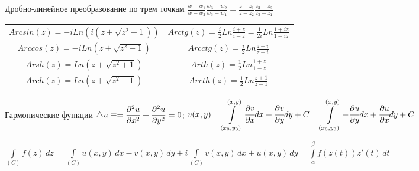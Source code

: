 \noindent
Дробно-линейное преобразование по трем точкам
$\displaystyle \frac{w-w_1}{w-w_2}\frac{w_3-w_2}{w_3-w_1} =
\frac{z-z_1}{z-z_2}\frac{z_3-z_2}{z_3-z_1}$

\vspace{1ex}
\noindent
\begin{tabular}{|c|c|}
	\hline
	$\displaystyle Arcsin(z) = -iLn(i(z + \sqrt{z^2 - 1}))$ &
	$\displaystyle Arctg(z) = \frac{i}{2}Ln\frac{i+z}{i-z} = \frac{1}{2i}Ln\frac{1+iz}{1-iz}$ \\

	$\displaystyle Arccos(z) = -iLn(z + \sqrt{z^2-1})$ &
	$\displaystyle Arcctg(z) = \frac{i}{2}Ln\frac{z-i}{z+i}$ \\

	\hline

	$\displaystyle Arsh(z) = Ln(z+\sqrt{z^2 + 1})$ &
	$\displaystyle Arth(z) = \frac{1}{2}Ln\frac{1+z}{1-z}$ \\

	$\displaystyle Arch(z) = Ln(z+\sqrt{z^2 - 1})$ &
	$\displaystyle Arcth(z) = \frac{1}{2}Ln\frac{z+1}{z-1}$ \\
	\hline
\end{tabular}

\noindent
Гармонические функции
$\displaystyle \mathop{}\!\mathbin\bigtriangleup{u}\equiv =
\frac{\partial^2u}{\partial x^2} + \frac{\partial^2u}{\partial y^2} = 0$; \vspace{1em}
$\displaystyle v(x, y)
= \int\limits_{(x_0, y_0)}^{(x, y)} \cfrac{\partial v}{\partial x} dx + \cfrac{\partial v}{\partial y} dy + C
= \int\limits_{(x_0, y_0)}^{(x, y)} -\cfrac{\partial u}{\partial y} dx + \cfrac{\partial u}{\partial x} dy + C$

$\displaystyle\int\limits_{(C)}f(z)\,dz = \int\limits_{(C)}u(x, y)\,dx - v(x, y)\,dy + i\int\limits_{(C)}v(x, y)\,dx + u(x, y)\,dy = \int\limits_\alpha^\beta f(z(t))z'(t)\,dt$




